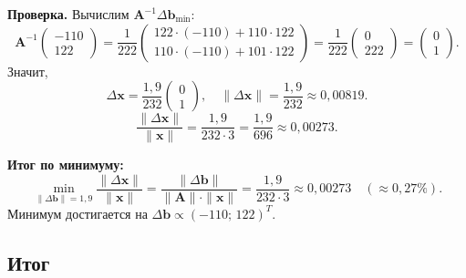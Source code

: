 \documentclass{article}
\begin{document}
\textbf{Проверка.} Вычислим $\mathbf{A}^{-1}\Delta\mathbf{b}_{\min}$:
\begin{equation}
\mathbf{A}^{-1} \begin{pmatrix} -110 \\ 122 \end{pmatrix} = \frac{1}{222} \begin{pmatrix} 122 \cdot (-110) + 110 \cdot 122 \\ 110 \cdot (-110) + 101 \cdot 122 \end{pmatrix} = \frac{1}{222} \begin{pmatrix} 0 \\ 222 \end{pmatrix} = \begin{pmatrix} 0 \\ 1 \end{pmatrix}.
\end{equation}
Значит,
\begin{equation}
\Delta\mathbf{x} = \frac{1{,}9}{232} \begin{pmatrix} 0 \\ 1 \end{pmatrix}, \quad \|\Delta\mathbf{x}\| = \frac{1{,}9}{232} \approx 0{,}00819.
\end{equation}
\begin{equation}
\frac{\|\Delta\mathbf{x}\|}{\|\mathbf{x}\|} = \frac{1{,}9}{232 \cdot 3} = \frac{1{,}9}{696} \approx 0{,}00273.
\end{equation}

\textbf{Итог по минимуму:}
\begin{equation}
\boxed{\min_{\|\Delta\mathbf{b}\|=1{,}9} \frac{\|\Delta\mathbf{x}\|}{\|\mathbf{x}\|} = \frac{\|\Delta\mathbf{b}\|}{\|\mathbf{A}\| \cdot \|\mathbf{x}\|} = \frac{1{,}9}{232 \cdot 3} \approx 0{,}00273 \quad (\approx 0{,}27\%).}
\end{equation}
Минимум достигается на $\Delta\mathbf{b} \propto (-110;\, 122)^T$.

\subsection*{Итог}
\end{document}
